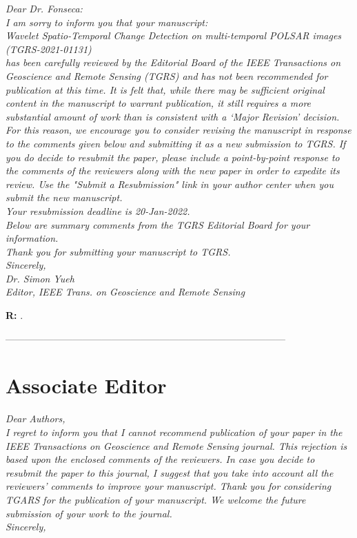 \documentclass[11pt]{report}
\begin{document}
\textit{
Dear Dr. Fonseca:\\
I am sorry to inform you that your manuscript:\\
Wavelet Spatio-Temporal Change Detection on multi-temporal POLSAR images (TGRS-2021-01131)\\
has been carefully reviewed by the Editorial Board of the IEEE Transactions on Geoscience and Remote Sensing
(TGRS) and has not been recommended for publication at this time. It is felt that, while there may be sufficient original
content in the manuscript to warrant publication, it still requires a more substantial amount of work than is consistent with
a ‘Major Revision’ decision. For this reason, we encourage you to consider revising the manuscript in response to the
comments given below and submitting it as a new submission to TGRS. If you do decide to resubmit the paper, please
include a point-by-point response to the comments of the reviewers along with the new paper in order to expedite its
review. Use the "Submit a Resubmission" link in your author center when you submit the new manuscript.\\
Your resubmission deadline is 20-Jan-2022.\\
Below are summary comments from the TGRS Editorial Board for your information.\\
Thank you for submitting your manuscript to TGRS.\\
Sincerely,\\
Dr. Simon Yueh\\
Editor, IEEE Trans. on Geoscience and Remote Sensing
}

\medskip

\textbf{R:} .

\noindent---------------------------------------------------------------------------------------
\section*{Associate Editor}

\textit{Dear Authors,\\
I regret to inform you that I cannot recommend publication of your paper in the IEEE Transactions on Geoscience and
Remote Sensing journal. This rejection is based upon the enclosed comments of the reviewers.
In case you decide to resubmit the paper to this journal, I suggest that you take into account all the reviewers’ comments
to improve your manuscript.
Thank you for considering TGARS for the publication of your manuscript. We welcome the future submission of your
work to the journal.\\
Sincerely,}
\end{document}
